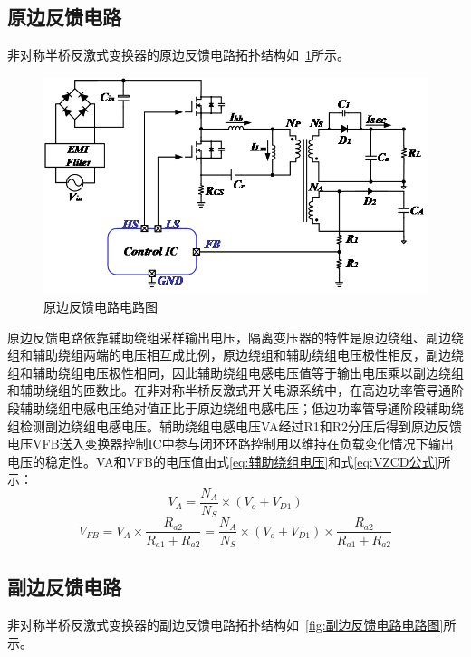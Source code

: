 \subsection{原边反馈电路}
非对称半桥反激式变换器的原边反馈电路拓扑结构如~\ref{fig:原边反馈电路电路图}所示。

\begin{figure}[htbp] 
    \centering
    \includegraphics[width=0.8\linewidth]{figures/原边反馈电路图.png}
    \caption{原边反馈电路电路图}
    \label{fig:原边反馈电路电路图}
\end{figure}

原边反馈电路依靠辅助绕组采样输出电压，隔离变压器的特性是原边绕组、副边绕组和辅助绕组两端的电压相互成比例，原边绕组和辅助绕组电压极性相反，副边绕组和辅助绕组电压极性相同，因此辅助绕组电感电压值等于输出电压乘以副边绕组和辅助绕组的匝数比。在非对称半桥反激式开关电源系统中，在高边功率管导通阶段辅助绕组电感电压绝对值正比于原边绕组电感电压；低边功率管导通阶段辅助绕组检测副边绕组电感电压。辅助绕组电感电压VA经过R1和R2分压后得到原边反馈电压VFB送入变换器控制IC中参与闭环环路控制用以维持在负载变化情况下输出电压的稳定性。VA和VFB的电压值由式\eqref{eq:辅助绕组电压}和式\eqref{eq:VZCD公式}所示：
\begin{equation}
    \label{eq:辅助绕组电压}
    V_A = \frac{N_A}{N_S}\times(V_o + V_{D1})
\end{equation}
\begin{equation}
    \label{eq:VZCD公式}
    V_{FB} = V_A\times\frac{R_{a2}}{R_{a1}+R_{a2}}=\frac{N_A}{N_S}\times(V_o + V_{D1})\times\frac{R_{a2}}{R_{a1}+R_{a2}}
\end{equation}

\subsection{副边反馈电路}
非对称半桥反激式变换器的副边反馈电路拓扑结构如~\ref{fig:副边反馈电路电路图}所示。

